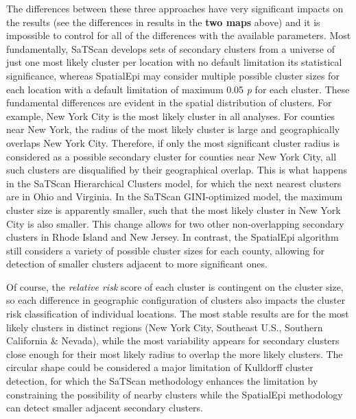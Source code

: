\documentclass[
]{article}
\begin{document}
The differences between these three approaches have very significant
impacts on the results (see the differences in results in the
\textbf{two maps} above) and it is impossible to control for all of the
differences with the available parameters. Most fundamentally, SaTScan
develops sets of secondary clusters from a universe of just one most
likely cluster per location with no default limitation its statistical
significance, whereas SpatialEpi may consider multiple possible cluster
sizes for each location with a default limitation of maximum 0.05
\emph{p} for each cluster. These fundamental differences are evident in
the spatial distribution of clusters. For example, New York City is the
most likely cluster in all analyses. For counties near New York, the
radius of the most likely cluster is large and geographically overlaps
New York City. Therefore, if only the most significant cluster radius is
considered as a possible secondary cluster for counties near New York
City, all such clusters are disqualified by their geographical overlap.
This is what happens in the SaTScan Hierarchical Clusters model, for
which the next nearest clusters are in Ohio and Virginia. In the SaTScan
GINI-optimized model, the maximum cluster size is apparently smaller,
such that the most likely cluster in New York City is also smaller. This
change allows for two other non-overlapping secondary clusters in Rhode
Island and New Jersey. In contrast, the SpatialEpi algorithm still
considers a variety of possible cluster sizes for each county, allowing
for detection of smaller clusters adjacent to more significant ones.

Of course, the \emph{relative risk} score of each cluster is contingent
on the cluster size, so each difference in geographic configuration of
clusters also impacts the cluster risk classification of individual
locations. The most stable results are for the most likely clusters in
distinct regions (New York City, Southeast U.S., Southern California \&
Nevada), while the most variability appears for secondary clusters close
enough for their most likely radius to overlap the more likely clusters.
The circular shape could be considered a major limitation of Kulldorff
cluster detection, for which the SaTScan methodology enhances the
limitation by constraining the possibility of nearby clusters while the
SpatialEpi methodology can detect smaller adjacent secondary clusters.
\end{document}
